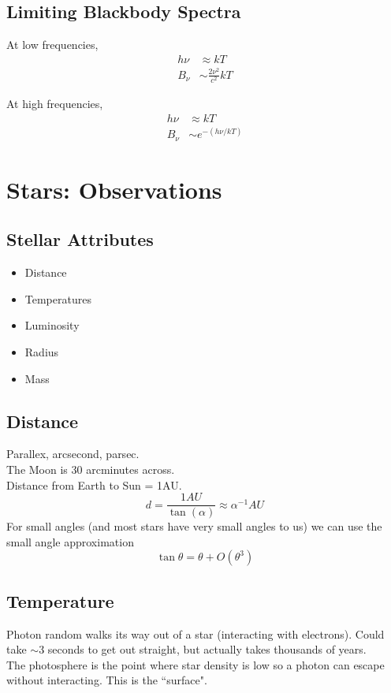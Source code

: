 \documentclass[a4paper]{article} %
\begin{document}
\subsection{Limiting Blackbody Spectra}
At low frequencies,
\begin{align*}
h\nu&\approx kT\\
B_\nu &\sim \frac{2\nu^2}{c^2}kT
\end{align*}

At high frequencies,
\begin{align*}
h\nu&\approx kT\\
B_\nu &\sim e^{-(h\nu/kT)}
\end{align*}


\section{Stars: Observations}
\subsection{Stellar Attributes}
\begin{itemize}
\item Distance
\item Temperatures
\item Luminosity
\item Radius
\item Mass
\end{itemize}

\subsection{Distance}
Parallex, arcsecond, parsec.\\
The Moon is 30 arcminutes across.\\
Distance from Earth to Sun = 1AU.
\begin{equation}
d=\frac{1AU}{\tan(\alpha)}\approx\alpha^{-1}AU
\end{equation}
For small angles (and most stars have very small angles to us) we can use the small angle approximation
\begin{equation}
\tan\theta=\theta+O(\theta^3)
\end{equation}

\subsection{Temperature}
Photon random walks its way out of a star (interacting with electrons). Could take $\sim$3 seconds to get out straight, but actually takes thousands of years.\\
The photosphere is the point where star density is low so a photon can escape without interacting. This is the ``surface".
\end{document}
